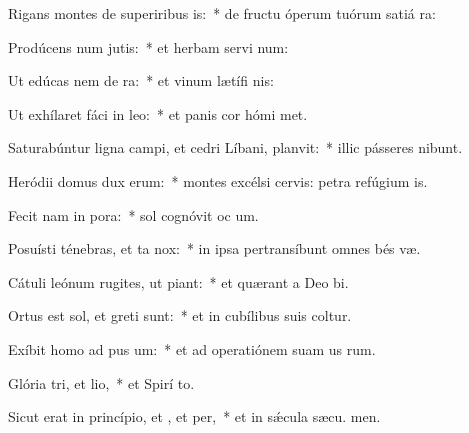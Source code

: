 \item Rigans montes de superiribus is:~* de fructu óperum tuórum satiá ra:
\item Prodúcens num jutis:~* et herbam servi num:
\item Ut edúcas nem de ra:~* et vinum lætífi  nis:
\item Ut exhílaret fáci in leo:~* et panis cor hómi met.
\item Saturabúntur ligna campi, et cedri Líbani,  planvit:~* illic pásseres nibunt.
\item Heródii domus dux  erum:~* montes excélsi cervis: petra refúgium is.
\item Fecit nam in pora:~* sol cognóvit oc um.
\item Posuísti ténebras, et ta  nox:~* in ipsa pertransíbunt omnes bés væ.
\item Cátuli leónum rugites, ut piant:~* et quærant a Deo  bi.
\item Ortus est sol, et greti sunt:~* et in cubílibus suis coltur.
\item Exíbit homo ad pus um:~* et ad operatiónem suam us  rum.
\item Glória tri, et lio,~* et Spirí to.
\item Sicut erat in princípio, et , et per,~* et in sǽcula sæcu. men.
